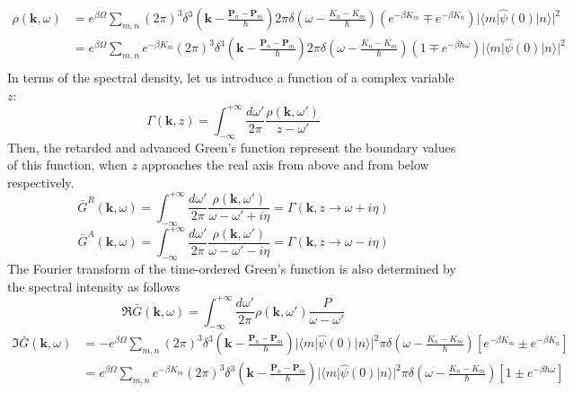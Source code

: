 \begin{equation}
\begin{aligned}
\rho(\mathbf{k},\omega)&=e^{\beta\Omega} \sum_{m,n} (2\pi)^3 \delta^3 (\mathbf{k}-\frac{\mathbf{P}_n-\mathbf{P}_m}{\hbar}) 2\pi \delta(\omega-\frac{K_n-K_m}{\hbar}) \left( e^{-\beta K_m} \mp e^{-\beta K_n} \right) |\langle m|\hat{\psi}(0) |n\rangle |^2\\
&=e^{\beta\Omega} \sum_{m,n} e^{-\beta K_m} (2\pi)^3 \delta^3 (\mathbf{k}-\frac{\mathbf{P}_n-\mathbf{P}_m}{\hbar}) 2\pi \delta(\omega-\frac{K_n-K_m}{\hbar}) \left( 1 \mp e^{-\beta \hbar \omega} \right) |\langle m|\hat{\psi}(0) |n\rangle |^2\\
\end{aligned}
\end{equation}
 In terms of the spectral density, let us introduce a function of a complex variable $z$:
\begin{equation}
\Gamma(\mathbf{k},z)=\int_{-\infty}^{+\infty} \frac{d\omega'}{2\pi} \frac{\rho(\mathbf{k},\omega')}{z-\omega'}
\end{equation}
Then, the retarded and advanced Green's function represent the boundary values of this function, when $z$ approaches the real axis from above and from below respectively.
\begin{equation}
\bar G^R(\mathbf{k},\omega)=\int_{-\infty}^{+\infty} \frac{d\omega'}{2\pi} \frac{\rho(\mathbf{k},\omega')}{\omega-\omega'+i\eta}=\Gamma(\mathbf{k},z\to\omega +i\eta)
\end{equation}
\begin{equation}\label{eq4.7.17}
\bar G^A(\mathbf{k},\omega)=\int_{-\infty}^{+\infty} \frac{d\omega'}{2\pi} \frac{\rho(\mathbf{k},\omega')}{\omega-\omega'-i\eta}=\Gamma(\mathbf{k},z\to\omega -i\eta)
\end{equation}
 The Fourier transform of the time-ordered Green's function is also determined by the spectral intensity as follows
\begin{equation}
\Re \bar G (\mathbf{k},\omega) =\int_{-\infty}^{+\infty} \frac{d\omega'}{2\pi} \rho(\mathbf{k},\omega') \frac{P}{\omega-\omega'}
\end{equation}
\[
\begin{aligned}
\Im \bar G (\mathbf{k},\omega)&=-e^{\beta\Omega} \sum_{m,n} (2\pi)^3 \delta^3 (\mathbf{k}-\frac{\mathbf{P}_n-\mathbf{P}_m}{\hbar}) |\langle m|\hat{\psi}(0) |n\rangle |^2 \pi \delta(\omega-\frac{K_n-K_m}{\hbar}) [e^{-\beta K_m}\pm e^{-\beta K_n}]\\
&=e^{\beta\Omega} \sum_{m,n} e^{-\beta K_m}(2\pi)^3 \delta^3 (\mathbf{k}-\frac{\mathbf{P}_n-\mathbf{P}_m}{\hbar}) |\langle m|\hat{\psi}(0) |n\rangle |^2 \pi \delta(\omega-\frac{K_n-K_m}{\hbar}) [1\pm e^{-\beta \hbar \omega}]
\end{aligned}
\]
